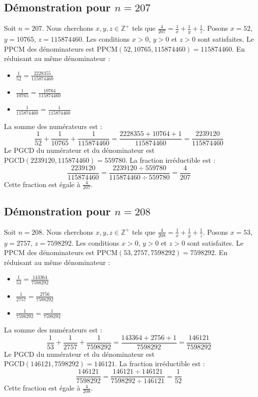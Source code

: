 \documentclass[11pt,a4paper]{article}
\begin{document}
\subsection{Démonstration pour $n = 207$}
Soit $n = 207$. Nous cherchons $x, y, z \in \mathbb{Z}^{+}$ tels que $\frac{4}{207} = \frac{1}{x} + \frac{1}{y} + \frac{1}{z}$.
Posons $x = 52$, $y = 10765$, $z = 115874460$.
Les conditions $x > 0$, $y > 0$ et $z > 0$ sont satisfaites.
Le PPCM des dénominateurs est $\text{PPCM}(52, 10765, 115874460) = 115874460$.
En réduisant au même dénominateur :
\begin{itemize}
    \item $\frac{1}{52} = \frac{2228355}{115874460}$
    \item $\frac{1}{10765} = \frac{10764}{115874460}$
    \item $\frac{1}{115874460} = \frac{1}{115874460}$
\end{itemize}
La somme des numérateurs est :
$$ \frac{1}{52} + \frac{1}{10765} + \frac{1}{115874460} = \frac{2228355 + 10764 + 1}{115874460} = \frac{2239120}{115874460} $$
Le PGCD du numérateur et du dénominateur est $\text{PGCD}(2239120, 115874460) = 559780$.
La fraction irréductible est :
$$ \frac{2239120}{115874460} = \frac{2239120 \div 559780}{115874460 \div 559780} = \frac{4}{207} $$
Cette fraction est égale à $\frac{4}{207}$.

\subsection{Démonstration pour $n = 208$}
Soit $n = 208$. Nous cherchons $x, y, z \in \mathbb{Z}^{+}$ tels que $\frac{4}{208} = \frac{1}{x} + \frac{1}{y} + \frac{1}{z}$.
Posons $x = 53$, $y = 2757$, $z = 7598292$.
Les conditions $x > 0$, $y > 0$ et $z > 0$ sont satisfaites.
Le PPCM des dénominateurs est $\text{PPCM}(53, 2757, 7598292) = 7598292$.
En réduisant au même dénominateur :
\begin{itemize}
    \item $\frac{1}{53} = \frac{143364}{7598292}$
    \item $\frac{1}{2757} = \frac{2756}{7598292}$
    \item $\frac{1}{7598292} = \frac{1}{7598292}$
\end{itemize}
La somme des numérateurs est :
$$ \frac{1}{53} + \frac{1}{2757} + \frac{1}{7598292} = \frac{143364 + 2756 + 1}{7598292} = \frac{146121}{7598292} $$
Le PGCD du numérateur et du dénominateur est $\text{PGCD}(146121, 7598292) = 146121$.
La fraction irréductible est :
$$ \frac{146121}{7598292} = \frac{146121 \div 146121}{7598292 \div 146121} = \frac{1}{52} $$
Cette fraction est égale à $\frac{4}{208}$.
\end{document}
